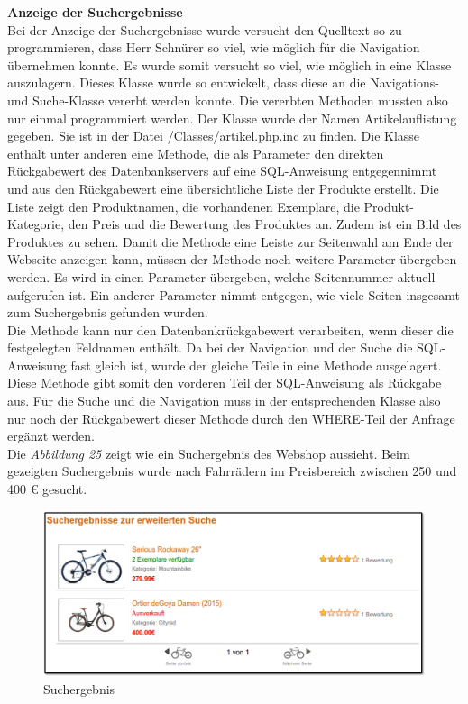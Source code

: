 \textbf{Anzeige der Suchergebnisse}\\
Bei der Anzeige der Suchergebnisse wurde versucht den Quelltext so zu programmieren, dass Herr Schnürer so viel, wie möglich für die Navigation übernehmen konnte. Es wurde somit versucht so viel, wie möglich in eine Klasse auszulagern. Dieses Klasse wurde so entwickelt, dass diese an die Navigations- und Suche-Klasse vererbt werden konnte. Die vererbten Methoden mussten also nur einmal programmiert werden. Der Klasse wurde der Namen \glqq Artikelauflistung\grqq{} gegeben. Sie ist in der Datei \glqq /Classes/artikel.php.inc\grqq{} zu finden. Die Klasse enthält unter anderen eine Methode, die als Parameter den direkten Rückgabewert des Datenbankservers auf eine SQL-Anweisung entgegennimmt und aus den Rückgabewert eine übersichtliche Liste der Produkte erstellt. Die Liste zeigt den Produktnamen, die vorhandenen Exemplare, die Produkt-Kategorie, den Preis und die Bewertung des Produktes an. Zudem ist ein Bild des Produktes zu sehen. Damit die Methode eine Leiste zur Seitenwahl am Ende der Webseite anzeigen kann, müssen der Methode noch weitere Parameter übergeben werden. Es wird in einen Parameter übergeben, welche Seitennummer aktuell aufgerufen ist. Ein anderer Parameter nimmt entgegen, wie viele Seiten insgesamt zum Suchergebnis gefunden wurden. \\
Die Methode kann nur den Datenbankrückgabewert verarbeiten, wenn dieser die festgelegten Feldnamen enthält. Da bei der Navigation und der Suche die SQL-Anweisung fast gleich ist, wurde der gleiche Teile in eine Methode ausgelagert. Diese Methode gibt somit den vorderen Teil der SQL-Anweisung als Rückgabe aus. Für die Suche und die Navigation muss in der entsprechenden Klasse also nur noch der Rückgabewert dieser Methode durch den \glqq WHERE-Teil \grqq{} der Anfrage ergänzt werden.\\
Die \textit{Abbildung 25} zeigt wie ein Suchergebnis des Webshop aussieht. Beim gezeigten Suchergebnis wurde nach Fahrrädern im Preisbereich zwischen 250 und 400 € gesucht.

\begin{figure}[H]
	\begin{center}
			\includegraphics[width=130mm]{Bilder/suchergebnis.png}
	\end{center}
	\caption{Suchergebnis}
\end{figure}